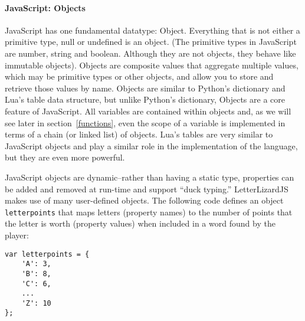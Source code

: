 
\paragraph{JavaScript: Objects}


JavaScript has one fundamental datatype: Object. Everything that is not either a
primitive type, null or undefined is an object. (The primitive types in JavaScript are
number, string and boolean. Although they are not objects, they behave like immutable
objects). Objects are composite values that aggregate multiple values, which may be
primitive types or other objects, and allow you to store and retrieve those values
by name. Objects are similar to Python's dictionary and Lua's table data structure, but
unlike Python's dictionary, Objects are a core feature of JavaScript. All variables are
contained within objects and, as we will see later in section~\ref{functions}, even
the scope of a variable is implemented in terms of a chain (or linked list) of objects.
Lua's tables are very similar to JavaScript objects and play a similar role in the
implementation of the language, but they are even more powerful.

JavaScript objects are dynamic--rather than having a static type, properties can be added
and removed at run-time and support ``duck typing.'' LetterLizardJS makes use of many
user-defined objects. The following code defines an object \texttt{letterpoints} that
maps letters (property names) to the number of points that the letter is worth
(property values) when included in a word found by the player:

\begin{lstlisting}[caption=A user-defined object in JavaScript.]
var letterpoints = {
	'A': 3,
	'B': 8,
	'C': 6,
	...
	'Z': 10
};
\end{lstlisting}

